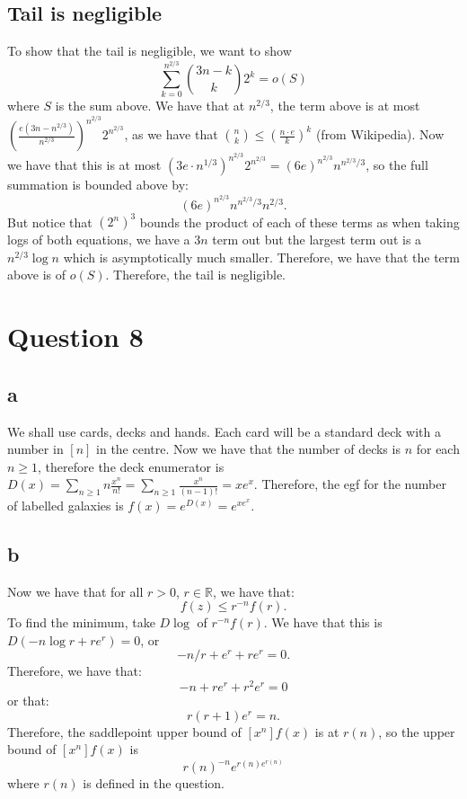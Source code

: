 \documentclass[]{article}
\theoremstyle{definition}
\numberwithin{theorem}{section}
\numberwithin{equation}{section}
\begin{document}
\subsection{Tail is negligible}
To show that the tail is negligible, we want to show
\begin{equation}
	\sum_{k = 0}^{n^{2/3}}\binom{3n - k}{k} 2^k = o(S)
\end{equation}
where $S$ is the sum above. 
We have that at $n^{2/3}$, the term above is at most $\left(\frac{e(3n - n^{2/3})}{n^{2/3}}\right)^{n^{2/3}} 2^{n^{2/3}}$, as we have that $\binom{n}{k} \leq \left(\frac{n \cdot e}{k}\right)^k$ (from Wikipedia). Now we have that this is at most $(3e \cdot n^{1/3})^{n^{2/3}} 2^{n^{2/3}} = (6e)^{n^{2/3}} n^{n^{2/3}/3}$, so the full summation is bounded above by:
\begin{equation}
	(6e)^{n^{2/3}} n^{n^{2/3}/3} n^{2/3}.
\end{equation} 
But notice that $(2^n)^3$ bounds the product of each of these terms as when taking logs of both equations, we have a $3n$ term out but the largest term out is a $ n^{2/3} \log n$ which is asymptotically much smaller. Therefore, we have that the term above is of $o(S)$. Therefore, the tail is negligible. 
\section{Question 8}
\subsection{a}
We shall use cards, decks and hands. Each card will be a standard deck with a number in $[n]$ in the centre. Now we have that the number of decks is $n$ for each $n \geq 1$, therefore the deck enumerator is $D(x) = \sum_{n \geq 1} n \frac{x^n}{n!} = \sum_{n \geq 1} \frac{x^n}{(n - 1)!} = x e^x$. 
Therefore, the egf for the number of labelled galaxies is $f(x) = e^{D(x)} = e^{x e^x}$. 

\subsection{b}
Now we have that for all $r > 0$, $r \in \mathbb{R}$, we have that:
\begin{equation}
	[z^n] f(z) \leq r^{-n} f(r).
\end{equation}
To find the minimum, take $D \log$ of $r^{-n} f(r)$. We have that this is $D(-n \log r + r e^r) = 0$, or 
\begin{equation}
	-n/r + e^r + r e^r = 0.
\end{equation}
Therefore, we have that:
\begin{equation}
	-n + r e^r + r^2 e^r = 0
\end{equation}
or that:
\begin{equation}
	r (r + 1) e^r = n.
\end{equation}
Therefore, the saddlepoint upper bound of $[x^n] f(x)$ is at $r(n)$, so the upper bound of $[x^n] f(x)$ is
\begin{equation}
	r(n)^{-n} e^{r(n) e^{r(n)}}
\end{equation}
 where $r(n)$ is defined in the question. 
\end{document}
